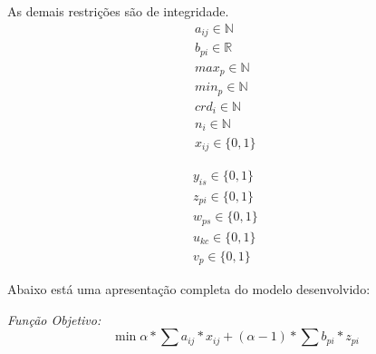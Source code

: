 As demais restrições são de integridade.
\begin{eqnarray}
\label{r24}
a_{ij}\in{\mathbb{N}} &&\\
\label{r25}
b_{pi} \in{\mathbb{R}} &&\\
\label{r26}
max_{p} \in{\mathbb{N}} &&\\
\label{r27}
min_{p} \in{\mathbb{N}} &&\\
\label{r28}
crd_{i} \in{\mathbb{N}} &&\\
\label{r29}
n_{i} \in{\mathbb{N}} &&\\
\label{r30}
x_{ij}\in{\{0,1\}} &&
\end{eqnarray}

\begin{eqnarray}
\label{r31}
y_{is}\in{\{0,1\}} &&\\
\label{r32}
z_{pi}\in{\{0,1\}} &&\\
\label{r33}
w_{ps}\in{\{0,1\}} && \\
\label{r34}
u_{kc}\in{\{0,1\}} && \\
\label{r35}
v_{p}\in{\{0,1\}} &&
\end{eqnarray}


Abaixo está uma apresentação completa do modelo desenvolvido:

\emph{Função Objetivo:}
$$
\min{\alpha * \sum a_{ij} * x_{ij} + (\alpha-1) * \sum b_{pi} * z_{pi}}
$$

